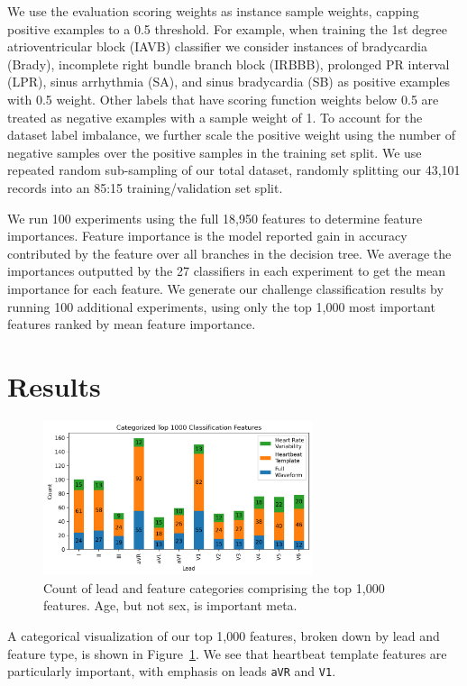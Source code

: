 \documentclass[twocolumn]{cinc}
\begin{document}
We use the evaluation scoring weights as instance sample weights, capping positive examples to a 0.5 threshold.
For example, when training the 1st degree atrioventricular block (IAVB) classifier we consider instances of bradycardia (Brady), incomplete right bundle branch block (IRBBB), prolonged PR interval (LPR), sinus arrhythmia (SA), and sinus bradycardia (SB) as positive examples with 0.5 weight.
Other labels that have scoring function weights below 0.5 are treated as negative examples with a sample weight of 1.
To account for the dataset label imbalance, we further scale the positive weight using the number of negative samples over the positive samples in the training set split.
We use repeated random sub-sampling of our total dataset, randomly splitting our 43,101 records into an 85:15 training/validation set split.

We run 100 experiments using the full 18,950 features to determine feature importances.
Feature importance is the model reported gain in accuracy contributed by the feature over all branches in the decision tree.
We average the importances outputted by the 27 classifiers in each experiment to get the mean importance for each feature.
We generate our challenge classification results by running 100 additional experiments, using only the top 1,000 most important features ranked by mean feature importance.

\section{Results}

\begin{figure}[ht]
  \centering
  \includegraphics[width=7.9cm]{fig/top_features_bar.png}
  \caption{Count of lead and feature categories comprising the top 1,000 features. Age, but not sex, is important meta.}
  \label{fig:top_features}
\end{figure}

A categorical visualization of our top 1,000 features, broken down by lead and feature type, is shown in Figure~\ref{fig:top_features}.
We see that heartbeat template features are particularly important, with emphasis on leads \texttt{aVR} and \texttt{V1}.
\end{document}
